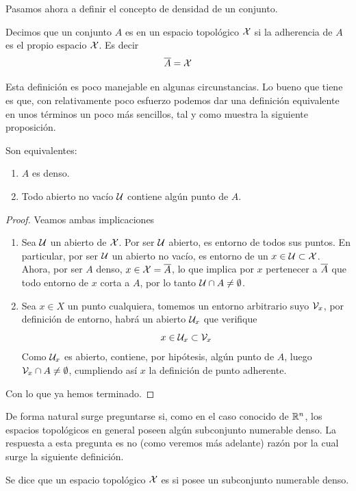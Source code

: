 Pasamos ahora a definir el concepto de densidad de un conjunto.
\begin{defi}
	\label{etop_def_denso}
	Decimos que un conjunto $A$ es  en un espacio topológico $\mathcal{X}$ si la adherencia de $A$ es el propio espacio $\mathcal{X}$. Es decir
	\begin{equation*}
	\overline{A}=\mathcal{X}
	\end{equation*}
\end{defi}
Esta definición es poco manejable en algunas circunstancias. Lo bueno que tiene es que, con relativamente poco esfuerzo podemos dar una definición equivalente en unos términos un poco más sencillos, tal y como muestra la siguiente proposición.
\begin{prop}
	Son equivalentes:
	\begin{enumerate}
		\item $A$ es denso.
		\item Todo abierto no vacío $\mathcal{U}$ contiene algún punto de $A$.
	\end{enumerate}
\end{prop}
\begin{proof} Veamos ambas implicaciones
	\begin{enumerate}
		\item[\bra] Sea $\mathcal{U}$ un abierto de $\mathcal{X}$. Por ser $\mathcal{U}$ abierto, es entorno de todos sus puntos. En particular, por ser $\mathcal{U}$ un abierto no vacío, es entorno de un $x \in \mathcal{U} \subset \mathcal{X}$. Ahora, por ser $A$ denso, $x \in \mathcal{X} = \overline{A}$, lo que implica por $x$ pertenecer a $\overline{A}$ que todo entorno de $x$ corta a $A$, por lo tanto $\mathcal{U}\cap A\not= \emptyset$.
		\item[\bla] Sea $x\in X$ un punto cualquiera, tomemos un entorno arbitrario suyo $\mathcal{V}_x$, por definición de entorno, habrá un abierto $\mathcal{U}_x$ que verifique
		\begin{equation*}
		x\in\mathcal{U}_x\subset\mathcal{V}_x
		\end{equation*}
		Como $\mathcal{U}_x$ es abierto, contiene, por hipótesis, algún punto de $A$, luego $\mathcal{V}_x\cap A\not=\emptyset$, cumpliendo así $x$ la definición de punto adherente.
	\end{enumerate}
	Con lo que ya hemos terminado.
\end{proof}
De forma natural surge preguntarse si, como en el caso conocido de $\mathbb{R}^n$, los espacios topológicos en general poseen algún subconjunto numerable denso. La respuesta a esta pregunta es no (como veremos más adelante) razón por la cual surge la siguiente definición.
\begin{defi}
	Se dice que un espacio topológico $\mathcal{X}$ es  si posee un subconjunto numerable denso.
\end{defi}

